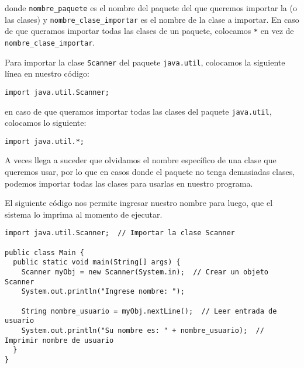 \documentclass[12pt]{article}
\newcounter{it}
\theoremstyle{largebreak}
\begin{document}
    donde \lstinline|nombre_paquete| es el nombre del paquete del que queremos importar la (o las clases) y \lstinline|nombre_clase_importar| es el nombre de la clase a importar. En caso de que queramos importar todas las clases de un paquete, colocamos \lstinline|*| en vez de \lstinline|nombre_clase_importar|.

    \begin{exa}
        Para importar la clase \lstinline|Scanner| del paquete \lstinline|java.util|, colocamos la siguiente línea en nuestro código:

        \begin{lstlisting}[caption={Importar Clase \lstinline|Scanner|},label=DescriptiveLabel]
import java.util.Scanner;
        \end{lstlisting}

        en caso de que queramos importar todas las clases del paquete \lstinline|java.util|, colocamos lo siguiente:
        \begin{lstlisting}[caption={Importar todas las Clases del Paquete \lstinline|java.util|},label=DescriptiveLabel]
import java.util.*;
        \end{lstlisting}
    \end{exa}

    \begin{obs}
        A veces llega a suceder que olvidamos el nombre específico de una clase que queremos usar, por lo que en casos donde el paquete no tenga demasiadas clases, podemos importar todas las clases para usarlas en nuestro programa.
    \end{obs}

    \begin{exa}
        El siguiente código nos permite ingresar nuestro nombre para luego, que el sistema lo imprima al momento de ejecutar.

        \begin{lstlisting}[caption={Uso Clase \lstinline|Scanner|.},label=DescriptiveLabel]
import java.util.Scanner;  // Importar la clase Scanner

public class Main {
  public static void main(String[] args) {
    Scanner myObj = new Scanner(System.in);  // Crear un objeto Scanner
    System.out.println("Ingrese nombre: ");

    String nombre_usuario = myObj.nextLine();  // Leer entrada de usuario
    System.out.println("Su nombre es: " + nombre_usuario);  // Imprimir nombre de usuario
  }
}
        \end{lstlisting}
    \end{exa}
\end{document}
